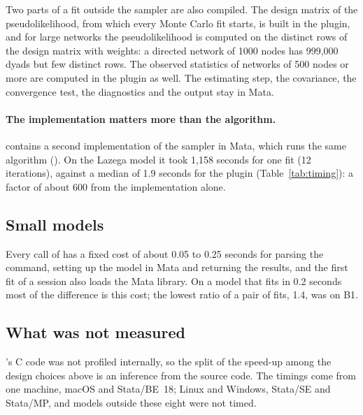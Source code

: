 Two parts of a fit outside the sampler are also compiled. The design matrix of the pseudolikelihood, from which every Monte Carlo fit starts, is built in the plugin, and for large networks the pseudolikelihood is computed on the distinct rows of the design matrix with weights: a directed network of 1000 nodes has 999,000 dyads but few distinct rows. The observed statistics of networks of 500 nodes or more are computed in the plugin as well. The estimating step, the covariance, the convergence test, the diagnostics and the output stay in Mata.

\paragraph{The implementation matters more than the algorithm.} \nwergm{} contains a second implementation of the sampler in Mata, which runs the same algorithm (). On the Lazega model it took 1,158 seconds for one fit (12 iterations), against a median of 1.9 seconds for the plugin (Table~\ref{tab:timing}): a factor of about 600 from the implementation alone.

\subsection{Small models}

Every call of \nwergm{} has a fixed cost of about 0.05 to 0.25 seconds for parsing the command, setting up the model in Mata and returning the results, and the first fit of a session also loads the Mata library. On a model that \ergm{} fits in 0.2 seconds most of the difference is this cost; the lowest ratio of a pair of fits, 1.4, was on B1.

\subsection{What was not measured}

\ergm{}'s C code was not profiled internally, so the split of the speed-up among the design choices above is an inference from the source code. The timings come from one machine, macOS and Stata/BE~18; Linux and Windows, Stata/SE and Stata/MP, and models outside these eight were not timed.

